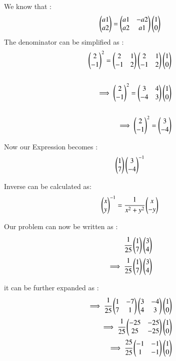 \begin{enumerate}[label=\thesection.\arabic*.,ref=\thesection.\theenumi]
\begin{enumerate}
We know that :
\begin{align}
    \begin{pmatrix}a1 \\ a2\end{pmatrix} = \begin{pmatrix}a1 & -a2\\a2 & a1\end{pmatrix}\begin{pmatrix}1 \\ 0\end{pmatrix}
\end{align}
The denominator can be simplified as :
\begin{align}
    \begin{pmatrix}2 \\ -1\end{pmatrix}^2 = \begin{pmatrix}2 & 1\\-1 & 2\end{pmatrix}\begin{pmatrix}2 & 1\\-1 & 2\end{pmatrix}\begin{pmatrix}1 \\ 0\end{pmatrix}
\\ \\
    \implies \begin{pmatrix}2 \\ -1\end{pmatrix}^2 = \begin{pmatrix}3 & 4\\-4 & 3\end{pmatrix}\begin{pmatrix}1 \\ 0\end{pmatrix}
\\ \\
    \implies \begin{pmatrix}2 \\ -1\end{pmatrix}^2 = \begin{pmatrix}3 \\-4\end{pmatrix}
\end{align}

Now our Expression becomes :
\begin{align}
    \begin{pmatrix}1 \\ 7\end{pmatrix}\begin{pmatrix}3\\-4\end{pmatrix}^{-1}
\end{align}

Inverse can be calculated as:
\begin{align}
    \begin{pmatrix}x \\ y\end{pmatrix}^{-1}=\cfrac{1}{x^2+y^2}\begin{pmatrix}x\\-y\end{pmatrix}
\end{align}

Our problem can now be written as :
\begin{align}
    \cfrac{1}{25}\begin{pmatrix}1 \\ 7\end{pmatrix}\begin{pmatrix}3\\4\end{pmatrix}
\\
    \implies \cfrac{1}{25}\begin{pmatrix}1 \\ 7\end{pmatrix}\begin{pmatrix}3\\4\end{pmatrix}
\end{align}

it can be further expanded as :
\begin{align}
    \implies \cfrac{1}{25}\begin{pmatrix}1 & -7\\7 & 1\end{pmatrix}\begin{pmatrix}3 & -4\\4 & 3\end{pmatrix}\begin{pmatrix}1 \\ 0\end{pmatrix}
\\
    \implies \cfrac{1}{25}\begin{pmatrix}-25 & -25\\25 & -25\end{pmatrix}\begin{pmatrix}1 \\ 0\end{pmatrix}
\\
    \implies \cfrac{25}{25}\begin{pmatrix}-1 & -1\\1 & -1\end{pmatrix}\begin{pmatrix}1 \\ 0\end{pmatrix}
\end{align}


\end{enumerate}
\end{enumerate}
